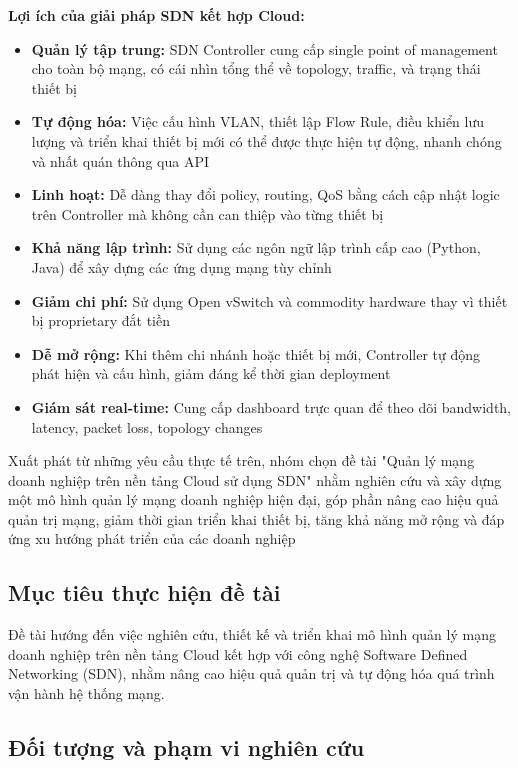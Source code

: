 \textbf{Lợi ích của giải pháp SDN kết hợp Cloud:}
\begin{itemize}
    \item \textbf{Quản lý tập trung:} SDN Controller cung cấp single point of management cho toàn bộ mạng, có cái nhìn tổng thể về topology, traffic, và trạng thái thiết bị
    \item \textbf{Tự động hóa:} Việc cấu hình VLAN, thiết lập Flow Rule, điều khiển lưu lượng và triển khai thiết bị mới có thể được thực hiện tự động, nhanh chóng và nhất quán thông qua API
    \item \textbf{Linh hoạt:} Dễ dàng thay đổi policy, routing, QoS bằng cách cập nhật logic trên Controller mà không cần can thiệp vào từng thiết bị
    \item \textbf{Khả năng lập trình:} Sử dụng các ngôn ngữ lập trình cấp cao (Python, Java) để xây dựng các ứng dụng mạng tùy chỉnh
    \item \textbf{Giảm chi phí:} Sử dụng Open vSwitch và commodity hardware thay vì thiết bị proprietary đắt tiền
    \item \textbf{Dễ mở rộng:} Khi thêm chi nhánh hoặc thiết bị mới, Controller tự động phát hiện và cấu hình, giảm đáng kể thời gian deployment
    \item \textbf{Giám sát real-time:} Cung cấp dashboard trực quan để theo dõi bandwidth, latency, packet loss, topology changes
\end{itemize}

Xuất phát từ những yêu cầu thực tế trên, nhóm chọn đề tài "Quản lý mạng doanh nghiệp trên nền tảng Cloud sử dụng SDN" nhằm nghiên cứu và xây dựng một mô hình quản lý mạng doanh nghiệp hiện đại, góp phần nâng cao hiệu quả quản trị mạng, giảm thời gian triển khai thiết bị, tăng khả năng mở rộng và đáp ứng xu hướng phát triển của các doanh nghiệp

\subsection{Mục tiêu thực hiện đề tài}
Đề tài hướng đến việc nghiên cứu, thiết kế và triển khai mô hình quản lý mạng doanh nghiệp trên nền tảng Cloud kết hợp với công nghệ Software Defined Networking (SDN), nhằm nâng cao hiệu quả quản trị và tự động hóa quá trình vận hành hệ thống mạng.

\subsection{Đối tượng và phạm vi nghiên cứu}

